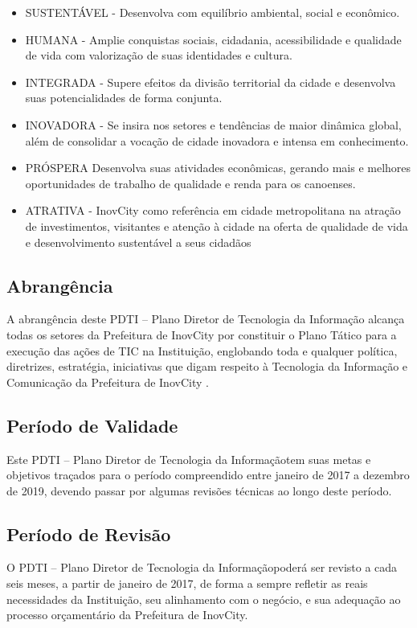 \documentclass[        
    a4paper,          %
    12pt,             %
    chapter=TITLE,    %
    section=Title,    %
    subsection=Title, %
    oneside,          %
    english,          %
    spanish,          %
    brazil,           %
    sumario=abnt-6027-2012,
]{abntex2}
\newcommand{\EMPRESA}{Prefeitura de InovCity}
\newcommand{\CIDADE}{InovCity}
\newcommand{\PDTI}{PDTI – Plano Diretor de Tecnologia da Informação}
\begin{document}
\begin{itemize}
	\item SUSTENTÁVEL - Desenvolva com equilíbrio ambiental, social e econômico.
	\item HUMANA - Amplie conquistas sociais, cidadania, acessibilidade e qualidade de vida com valorização de suas identidades e cultura.
	\item INTEGRADA - Supere efeitos da divisão territorial da cidade e desenvolva suas potencialidades de forma conjunta.
	\item INOVADORA - Se insira nos setores e tendências de maior dinâmica global, além de consolidar a vocação de cidade inovadora e 
intensa em conhecimento.
	\item PRÓSPERA Desenvolva suas atividades econômicas, gerando mais e melhores oportunidades de trabalho de qualidade e renda para os 
canoenses.
	\item ATRATIVA - \CIDADE{} como referência em cidade metropolitana na atração de investimentos, visitantes e atenção à cidade na oferta 
de qualidade de vida e desenvolvimento sustentável a seus cidadãos
\end{itemize}


\subsection{Abrang\^encia}
A abrangência deste \PDTI{} alcança todas os setores da \EMPRESA{} por constituir o Plano Tático para a execução das ações de TIC na 
Instituição, englobando toda e qualquer política, diretrizes, estratégia, iniciativas que digam respeito à Tecnologia da Informação e 
Comunicação da \EMPRESA{} .
\subsection{Per\'iodo de Validade}
Este \PDTI tem suas metas e objetivos traçados para o período compreendido entre janeiro de 2017 a dezembro de 2019, devendo passar 
por algumas revisões técnicas ao longo deste período.
\subsection{Per\'iodo de Revis\~ao}
O \PDTI poderá ser revisto a cada seis meses, a partir de janeiro de 2017, de forma a sempre refletir as reais necessidades da Instituição, 
seu alinhamento com o negócio, e sua adequação ao processo orçamentário da \EMPRESA{}.
\end{document}
